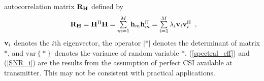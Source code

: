 \documentclass[10pt,fleqn, twocolumn]{IEEEtran}
\newcommand{\bh}{{\bf h}}
\newcommand{\bH}{{\bf H}}
\newcommand{\bv}{{\bf v}}
\newcommand{\bR}{{\bf R}}
\begin{document}
autocorrelation matrix $\bR_{\bH}$ defined by
\begin{equation}
\begin{array}{l}
\bR_{\bH}=\bH^{\rm H}\bH=\sum\limits_{m=1}^{M}\bh_{m}\bh_{m}^{\rm
H}=\sum\limits_{i=1}^{M}\lambda_{i}\bv_{i}\bv_{i}^{\rm H}
\end{array},\label{R_h}
\end{equation}
\noindent $\bv_{i}$ denotes the $i$th eigenvector, the operator
$\left|\ast\right|$ denotes the determinant of matrix $\ast$, and
$\mbox{var}\left\{\ast\right\}$ denotes the variance of random
variable $\ast$. (\ref{spectral_eff}) and (\ref{SNR_i}) are the
results from the assumption of perfect CSI available at
transmitter. This may not be consistent with practical
applications.
\begin{figure}
\end{figure}
\end{document}
